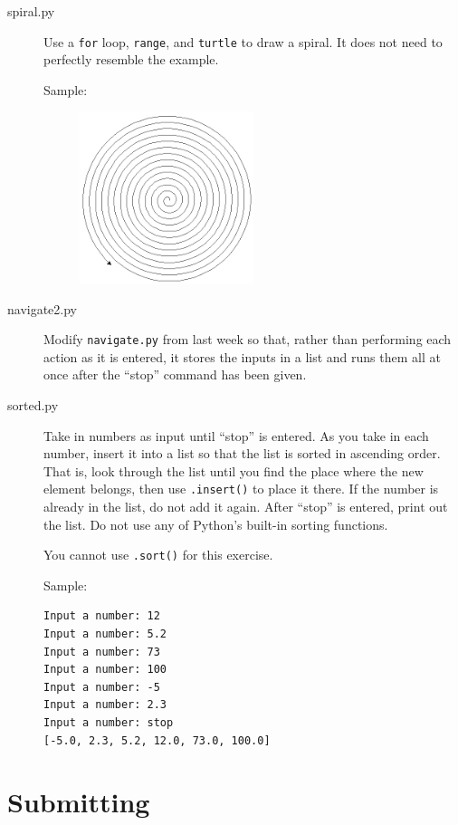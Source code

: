 \documentclass[11pt]{cselabheader}
\begin{document}
\begin{description}
  \item[spiral.py] Use a \lstinline{for} loop, \lstinline{range}, and
    \lstinline{turtle} to draw a spiral. It does not need to perfectly resemble
    the example.

    Sample:
    \begin{figure}[h]
      \centering
      \includegraphics[width=2.0in]{img/spiral}
    \end{figure}

  \item[navigate2.py] Modify \texttt{navigate.py} from last week so that,
    rather than performing each action as it is entered, it stores the inputs in a
    list and runs them all at once after the ``stop'' command has been given.

  \item[sorted.py] Take in numbers as input until ``stop'' is entered. As you
    take in each number, insert it into a list so that the list is sorted in
    ascending order. That is, look through the list until you find the place
    where the new element belongs, then use \lstinline{.insert()} to place it
    there. If the number is already in the list, do not add it again. After
    ``stop'' is entered, print out the list. Do not use any of Python's built-in
    sorting functions.

    You cannot use \lstinline!.sort()! for this exercise.

    Sample:
\begin{lstlisting}[style=ipython]
Input a number: 12
Input a number: 5.2
Input a number: 73
Input a number: 100
Input a number: -5
Input a number: 2.3
Input a number: stop
[-5.0, 2.3, 5.2, 12.0, 73.0, 100.0]
\end{lstlisting}

\end{description}

\pagebreak
\section{Submitting}
\end{document}
